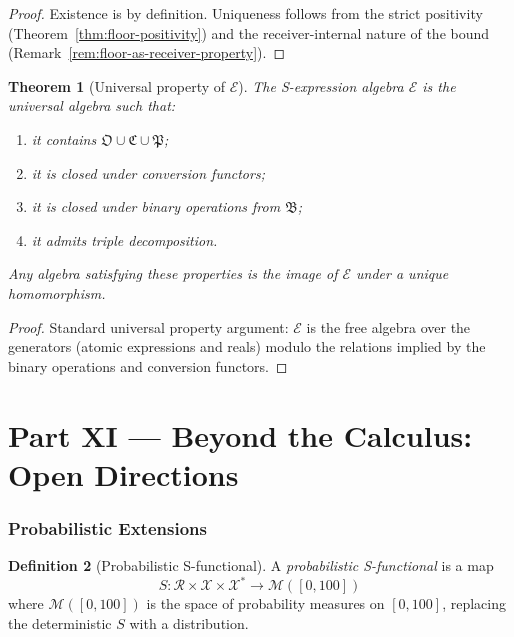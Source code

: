 \documentclass[11pt,a4paper]{article}
\theoremstyle{thmstyle}
\newtheorem{theorem}{Theorem}[section]
\theoremstyle{thmstyle}
\theoremstyle{definition}
\newtheorem{definition}[theorem]{Definition}
\theoremstyle{remark}
\newcommand{\Receiver}{\mathcal{R}}
\newcommand{\Cands}{\mathcal{X}}
\newcommand{\Truth}{\mathcal{X}^{*}}
\newcommand{\Osc}{\mathfrak{O}}
\newcommand{\Cat}{\mathfrak{C}}
\newcommand{\Part}{\mathfrak{P}}
\newcommand{\Expr}{\mathcal{E}}
\newcommand{\Cat}{\mathfrak{C}}
\newcommand{\Sscalar}{S}
\begin{document}
\begin{proof}
Existence is by definition.  Uniqueness follows
from the strict positivity (Theorem~\ref{thm:floor-positivity})
and the receiver-internal nature of the bound
(Remark~\ref{rem:floor-as-receiver-property}).
\end{proof}

\begin{theorem}[Universal property of $\Expr$]
\label{thm:univ-expr}
The S-expression algebra $\Expr$ is the universal
algebra such that:
\begin{enumerate}[nosep,label=(\roman*)]
\item it contains $\Osc \cup \Cat \cup \Part$;
\item it is closed under conversion functors;
\item it is closed under binary operations from
      $\mathfrak{B}$;
\item it admits triple decomposition.
\end{enumerate}
Any algebra satisfying these properties is the
image of $\Expr$ under a unique homomorphism.
\end{theorem}

\begin{proof}
Standard universal property argument: $\Expr$ is
the free algebra over the generators (atomic
expressions and reals) modulo the relations
implied by the binary operations and conversion
functors.
\end{proof}

\clearpage

\part*{Part XI --- Beyond the Calculus: Open Directions}

\section{Probabilistic Extensions}
\label{sec:prob-extensions}

\begin{definition}[Probabilistic S-functional]
\label{def:prob-S}
A \emph{probabilistic S-functional} is a map
\[
\Sscalar : \Receiver \times \Cands \times \Truth
   \to \mathcal{M}([0, 100])
\]
where $\mathcal{M}([0, 100])$ is the space of
probability measures on $[0, 100]$, replacing the
deterministic $\Sscalar$ with a distribution.
\end{definition}
\end{document}
